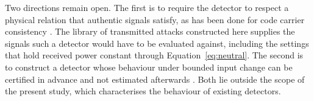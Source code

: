 Two directions remain open. The first is to require the detector to respect a physical
relation that authentic signals satisfy, as has been done for code carrier consistency
\citep{song2026generalized}. The library of transmitted attacks constructed here supplies
the signals such a detector would have to be evaluated against, including the settings
that hold received power constant through Equation~\ref{eq:neutral}. The second is
to construct a detector whose behaviour under bounded input change can be certified in
advance and not estimated afterwards \citep{cohen2019certified}. Both lie outside
the scope of the present study, which characterises the behaviour of existing detectors.
